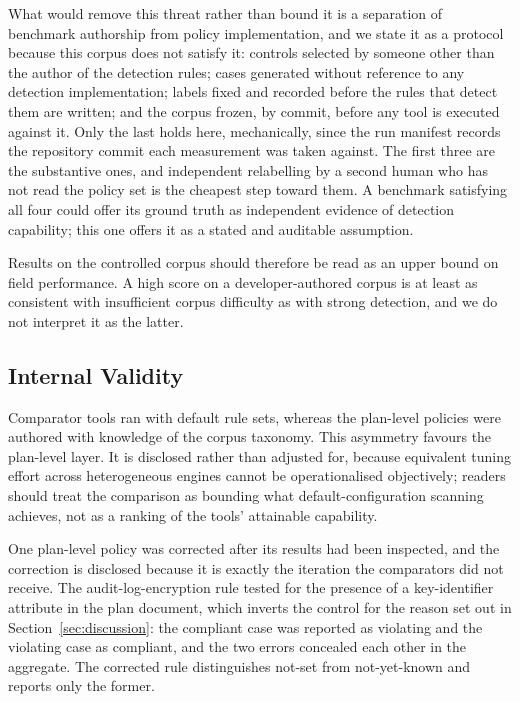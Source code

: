 \documentclass[smallextended]{svjour3}
\begin{document}
What would remove this threat rather than bound it is a separation of benchmark
authorship from policy implementation, and we state it as a protocol because this
corpus does not satisfy it: controls selected by someone other than the author of
the detection rules; cases generated without reference to any detection
implementation; labels fixed and recorded before the rules that detect them are
written; and the corpus frozen, by commit, before any tool is executed against it.
Only the last holds here, mechanically, since the run manifest records the
repository commit each measurement was taken against. The first three are the
substantive ones, and independent relabelling by a second human who has not read
the policy set is the cheapest step toward them. A benchmark satisfying all four
could offer its ground truth as independent evidence of detection capability;
this one offers it as a stated and auditable assumption.

Results on the controlled corpus should therefore be read as an upper bound on
field performance. A high score on a developer-authored corpus is at least as
consistent with insufficient corpus difficulty as with strong detection, and we
do not interpret it as the latter.

\subsection{Internal Validity}
\label{sec:internal}
Comparator tools ran with default rule sets, whereas the plan-level policies were
authored with knowledge of the corpus taxonomy. This asymmetry favours the
plan-level layer. It is disclosed rather than adjusted for, because equivalent
tuning effort across heterogeneous engines cannot be operationalised objectively;
readers should treat the comparison as bounding what default-configuration
scanning achieves, not as a ranking of the tools' attainable capability.

One plan-level policy was corrected after its results had been inspected, and the
correction is disclosed because it is exactly the iteration the comparators did
not receive. The audit-log-encryption rule tested for the presence of a
key-identifier attribute in the plan document, which inverts the control for the
reason set out in Section~\ref{sec:discussion}: the compliant case was reported as
violating and the violating case as compliant, and the two errors concealed each
other in the aggregate. The corrected rule distinguishes not-set from
not-yet-known and reports only the former.
\end{document}
